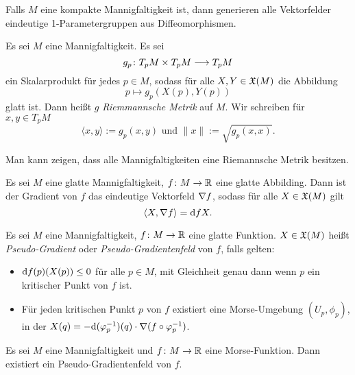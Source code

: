\begin{remark}
    Falls $M$ eine kompakte Mannigfaltigkeit ist, dann generieren alle Vektorfelder eindeutige 
    1-Parametergruppen aus Diffeomorphismen.
\end{remark}

\begin{definition}
    \label{def: riemannsche metrik}
    Es sei $M$ eine Mannigfaltigkeit. Es sei 
    \[ g_p \colon T_pM \times T_pM \longrightarrow T_pM \]
    ein Skalarprodukt für jedes $p \in M$, sodass für alle $X, Y \in { \mathfrak{X} } (M)$ die Abbildung 
    \[ p \longmapsto g_p(X(p), Y(p)) \]
    glatt ist. Dann heißt $g$ \textit{Riemmannsche Metrik} auf $M$. Wir schreiben für 
    $x, y \in T_pM$ 
    \[ \langle x, y \rangle := g_p(x, y) \text{ und } \| x \| := \sqrt{g_p(x, x)} . \]
\end{definition}

\begin{remark}
    Man kann zeigen, dass alle Mannigfaltigkeiten eine Riemannsche Metrik besitzen.
\end{remark}

\begin{definition}[Gradient]
    \label{def: gradient}
    Es sei $M$ eine glatte Mannigfaltigkeit, $f \colon M \to { \mathbb R }$ eine glatte Abbilding. Dann 
    ist der Gradient von $f$ das eindeutige Vektorfeld ${ \nabla } f$, sodass für alle $X \in { \mathfrak{X} } (M)$
    gilt 
    \[ \langle X , { \nabla } f \rangle = { \operatorname{d} } f X . \]
\end{definition}

\begin{definition}
    \label{def: pseudo-gradient}
    Es sei $M$ eine Mannigfaltigkeit, $f \colon M \to { \mathbb R }$ eine glatte Funktion. $X \in { \mathfrak{X} } (M)$
    heißt \textit{Pseudo-Gradient} oder \textit{Pseudo-Gradientenfeld} von $f$, falls gelten:
    \begin{itemize}
        \item ${ \operatorname{d} } f (p) (X(p)) \leq 0$ für alle $p \in M$, mit Gleichheit genau dann wenn 
            $p$ ein kritischer Punkt von $f$ ist.
        \item Für jeden kritischen Punkt $p$ von $f$ existiert eine Morse-Umgebung 
            $(U_p, \phi_p)$, in der $X (q) = - { \operatorname{d} } (\varphi_p^{-1}) (q) \cdot { \nabla } (f \circ \varphi_p^{-1})$.
    \end{itemize}
\end{definition}

\begin{prop}
    Es sei $M$ eine Mannigfaltigkeit und $f \colon M \to { \mathbb R }$ eine Morse-Funktion. 
    Dann existiert ein Pseudo-Gradientenfeld von $f$.
\end{prop}

